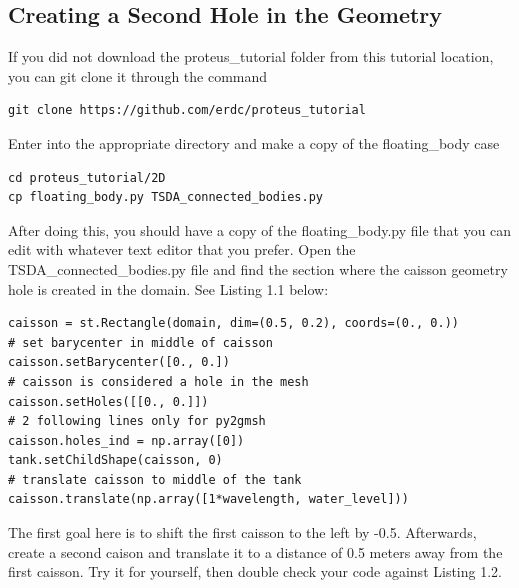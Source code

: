 \documentclass{report}
\begin{document}
\subsection{Creating a Second Hole in the Geometry}
If you did not download the proteus\_tutorial folder from this tutorial location, you can git clone it through the command
{
\color{myred}
\begin{verbatim}
git clone https://github.com/erdc/proteus_tutorial        	
\end{verbatim} 
}
\noindent Enter into the appropriate directory and make a copy of the floating\_body case
{
\color{myred}
\begin{verbatim}
cd proteus_tutorial/2D
cp floating_body.py TSDA_connected_bodies.py        	
\end{verbatim} 
}
\noindent After doing this, you should have a copy of the floating\_body.py file that you can edit with whatever text editor that you prefer. Open the TSDA\_connected\_bodies.py file and find the section where the caisson geometry hole is created in the domain. See Listing 1.1 below:
\lstset{language=Python}
\lstset{frame=lines}
\lstset{basicstyle=\footnotesize}
\begin{lstlisting}
caisson = st.Rectangle(domain, dim=(0.5, 0.2), coords=(0., 0.))
# set barycenter in middle of caisson
caisson.setBarycenter([0., 0.])
# caisson is considered a hole in the mesh
caisson.setHoles([[0., 0.]])
# 2 following lines only for py2gmsh
caisson.holes_ind = np.array([0])
tank.setChildShape(caisson, 0)
# translate caisson to middle of the tank
caisson.translate(np.array([1*wavelength, water_level]))
\end{lstlisting}
% 
The first goal here is to shift the first caisson to the left by -0.5. Afterwards, create a second caison and translate it to a distance of 0.5 meters away from the first caisson. Try it for yourself, then double check your code against Listing 1.2.
%
\lstset{language=Python}
\lstset{frame=lines}
\lstset{basicstyle=\footnotesize}
\end{document}
